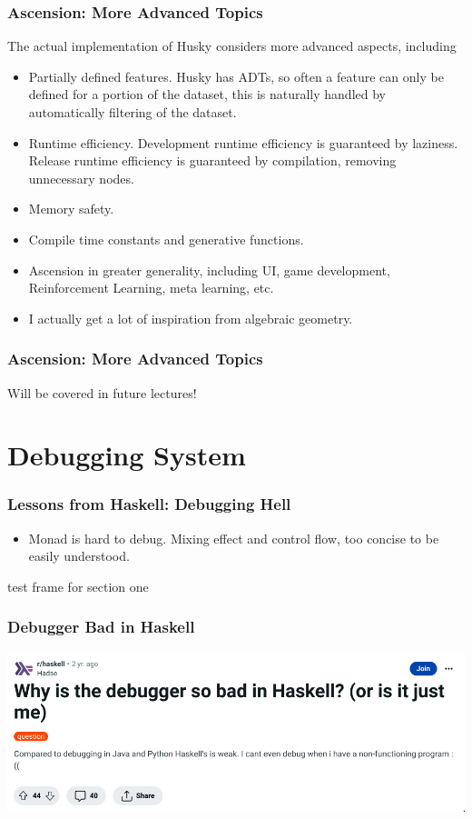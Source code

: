 \documentclass{beamer}   	%
\theoremstyle{definition}
\begin{document}
\begin{frame}
\frametitle{Ascension: More Advanced Topics}

The actual implementation of Husky considers more advanced aspects, including

\begin{itemize}
	\item Partially defined features. Husky has ADTs, so often a feature can only be defined for a portion of the dataset, this is naturally handled by automatically filtering of the dataset.
	\item Runtime efficiency. Development runtime efficiency is guaranteed by laziness. Release runtime efficiency is guaranteed by compilation, removing unnecessary nodes.
	\item Memory safety.
	\item Compile time constants and generative functions.
	\item Ascension in greater generality, including UI, game development, Reinforcement Learning, meta learning, etc.
	\item I actually get a lot of inspiration from algebraic geometry.
\end{itemize}

\end{frame}

\begin{frame}
\frametitle{Ascension: More Advanced Topics}
Will be covered in future lectures!
\end{frame}

\section{Debugging System}

\begin{frame}
\frametitle{Lessons from Haskell: Debugging Hell}
\begin{itemize}
	\item Monad is hard to debug. Mixing effect and control flow, too concise to be easily understood.
\end{itemize}
\end{frame}

\begin{frame}
test frame for section one
\end{frame}

\begin{frame}
\frametitle{Debugger Bad in Haskell}
	\includegraphics[width=\linewidth]{snapshots/haskell_debugging_is_hard00.png}
\end{frame}
\end{document}
